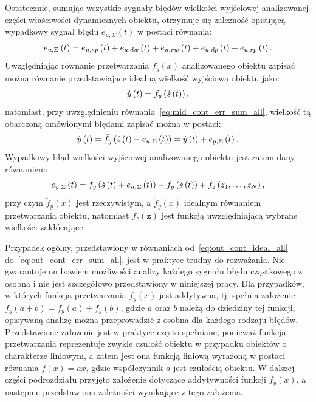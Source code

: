 Ostatecznie, sumując wszystkie sygnały błędów wielkości wyjściowej analizowanej części właściwości dynamicznych obiektu, otrzymuje się zależność opisującą wypadkowy sygnał błędu $e_{u,\Sigma}(t)$ w postaci równania:
\begin{equation}
e_{u,\Sigma} \left(t\right) = e_{u,sp} \left(t\right) + e_{u,dw} \left(t\right) + e_{u,rw} \left(t\right) + e_{u,dp} \left(t\right) + e_{u,rp} \left(t\right) \label{eq:mid_cont_err_sum_all}.
\end{equation}
Uwzględniając równanie przetwarzania $f_{y}(x)$ analizowanego obiektu zapisać można równanie przedstawiające idealną wielkość wyjściową obiektu jako:
\begin{equation}
\dot{y} \left(t\right) = \dot{f}_{y} \left( \dot{s} \left(t\right) \right) \label{eq:out_cont_ideal_all},
\end{equation}
natomiast, przy uwzględnieniu równania~\eqref{eq:mid_cont_err_sum_all}, wielkość tą obarczoną omówionymi błędami zapisać można w postaci:
\begin{equation}
\tilde{y} \left(t\right) = \tilde{f}_{y} \left( \dot{s} \left(t\right) + e_{u,\Sigma} \left(t\right) \right) = \dot{y} \left(t\right) + e_{y,\Sigma} \left(t\right) \label{eq:out_cont_real_all}.
\end{equation}
Wypadkowy błąd wielkości wyjściowej analizowanego obiektu jest zatem dany równaniem:
\begin{equation}
e_{y,\Sigma} \left(t\right) = \tilde{f}_{y} \left( \dot{s} \left(t\right) + e_{u,\Sigma} \left(t\right) \right) - \dot{f}_{y} \left( \dot{s} \left(t\right) \right) + f_{z} \left( z_{1}, \hdots, z_{N} \right) \label{eq:out_cont_err_sum_all},
\end{equation}
przy czym $\tilde{f}_{y}(x)$ jest rzeczywistym, a $\dot{f}_{y}(x)$ idealnym równaniem przetwarzania obiektu, natomiast $f_{z}(\mathbf{z})$ jest funkcją uwzględniającą wybrane wielkości zakłócające.

Przypadek ogólny, przedstawiony w równaniach od~\eqref{eq:out_cont_ideal_all} do~\eqref{eq:out_cont_err_sum_all}, jest w praktyce trudny do rozważania. Nie gwarantuje on bowiem możliwości analizy każdego sygnału błędu cząstkowego z osobna i nie jest szczegółowo przedstawiony w niniejszej pracy. Dla przypadków, w których funkcja przetwarzania $f_{y}(x)$ jest addytywna, tj. spełnia założenie $f_{y}(a + b) = f_{y}(a) + f_{y}(b)$, gdzie $a$ oraz $b$ należą do dziedziny tej funkcji, opisywaną analizę można przeprowadzić z osobna dla każdego rodzaju błędów. Przedstawione założenie jest w praktyce często spełniane, ponieważ funkcja przetwarzania reprezentuje zwykle czułość obiektu w przypadku obiektów o charakterze liniowym, a zatem jest ona funkcją liniową wyrażoną w postaci równania $f(x) = ax$, gdzie współczynnik $a$ jest czułością obiektu. W dalszej części podrozdziału przyjęto założenie dotyczące addytywności funkcji $f_{y}(x)$, a następnie przedstawiono zależności wynikające z tego założenia.


